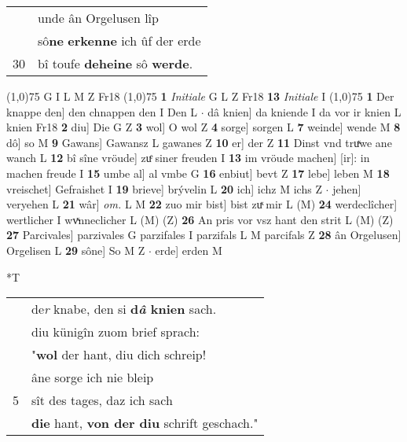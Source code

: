 \documentclass[8pt,a4paper,notitlepage]{article}
\begin{document}
\begin{table}[ht]
\begin{minipage}[t]{0.5\linewidth}
\begin{tabular}{rl}
 & unde ân Orgelusen lîp\\ 
 & sô\textbf{ne} \textbf{erkenne} ich ûf der erde\\ 
30 & bî toufe \textbf{deheine} sô \textbf{werde}.\\ 
\end{tabular}
\scriptsize
\line(1,0){75} \newline
G I L M Z Fr18 \newline
\line(1,0){75} \newline
\textbf{1} \textit{Initiale} G L Z Fr18  \textbf{13} \textit{Initiale} I  \newline
\line(1,0){75} \newline
\textbf{1} Der knappe den] den chnappen den I Den L  $\cdot$ dâ knien] da kniende I da vor ir knien L knien Fr18 \textbf{2} diu] Die G Z \textbf{3} wol] O wol Z \textbf{4} sorge] sorgen L \textbf{7} weinde] wende M \textbf{8} dô] so M \textbf{9} Gawans] Gawansz L gawanes Z \textbf{10} er] der Z \textbf{11} Dinst vnd truͯwe ane wanch L \textbf{12} bî sîne vröude] zuͤ siner freuden I \textbf{13} im vröude machen] [ir]: in machen freude I \textbf{15} umbe al] al vmbe G \textbf{16} enbiut] bevt Z \textbf{17} lebe] leben M \textbf{18} vreischet] Gefraishet I \textbf{19} brieve] brývelin L \textbf{20} ich] ichz M ichs Z  $\cdot$ jehen] veryehen L \textbf{21} wâr] \textit{om.} L M \textbf{22} zuo mir bist] bist zuͯ mir L (M) \textbf{24} werdeclîcher] wertlicher I wvͯnneclicher L (M) (Z) \textbf{26} An pris vor vsz hant den strit L (M) (Z) \textbf{27} Parcivales] parzivales G parzifales I parzifals L M parcifals Z \textbf{28} ân Orgelusen] Orgelisen L \textbf{29} sône] So M Z  $\cdot$ erde] erden M \newline
\end{minipage}
\hspace{0.5cm}
\begin{minipage}[t]{0.5\linewidth}
\small
\begin{center}*T
\end{center}
\begin{tabular}{rl}
 & de\textit{r} knabe, den si \textbf{d\textit{â} knien} sach.\\ 
 & diu künigîn zuom brief sprach:\\ 
 & "\textbf{wol} der hant, diu dich schreip!\\ 
 & âne sorge ich nie bleip\\ 
5 & sît des tages, daz ich sach\\ 
 & \textbf{die} hant, \textbf{von der diu} schrift geschach."\\ 

\end{tabular}
\end{minipage}
\end{table}
\end{document}
